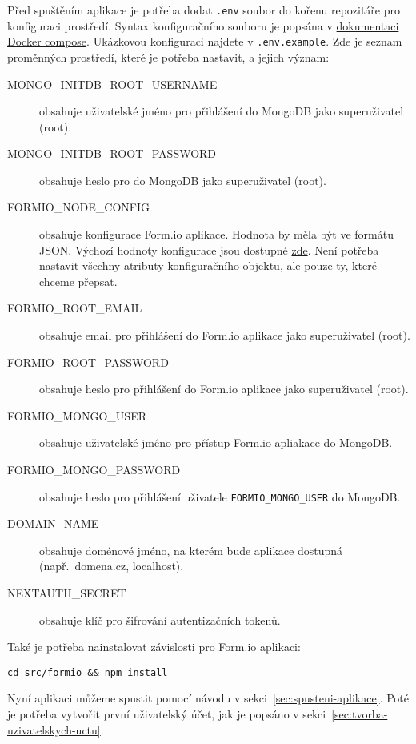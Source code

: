 Před spuštěním aplikace je potřeba dodat \texttt{.env} soubor do kořenu repozitáře pro konfiguraci prostředí.
Syntax konfiguračního souboru je popsána v \href{https://docs.docker.com/compose/environment-variables/env-file/}{dokumentaci Docker compose}.
Ukázkovou konfiguraci najdete v \texttt{.env.example}.
Zde je seznam proměnných prostředí, které je potřeba nastavit, a jejich význam:

\begin{description}
    \item[MONGO\_INITDB\_ROOT\_USERNAME] obsahuje uživatelské jméno pro přihlášení do MongoDB jako superuživatel (root).
    \item[MONGO\_INITDB\_ROOT\_PASSWORD] obsahuje heslo pro do MongoDB jako superuživatel (root).
    \item[FORMIO\_NODE\_CONFIG] obsahuje konfigurace Form.io aplikace.
    Hodnota by měla být ve formátu JSON\@.
    Výchozí hodnoty konfigurace jsou dostupné \href{https://github.com/formio/formio/blob/3.5.x/config/default.json}{zde}.
    Není potřeba nastavit všechny atributy konfiguračního objektu, ale pouze ty, které chceme přepsat.
    \item[FORMIO\_ROOT\_EMAIL] obsahuje email pro přihlášení do Form.io aplikace jako superuživatel (root).
    \item[FORMIO\_ROOT\_PASSWORD] obsahuje heslo pro přihlášení do Form.io aplikace jako superuživatel (root).
    \item[FORMIO\_MONGO\_USER] obsahuje uživatelské jméno pro přístup Form.io apliakace do MongoDB\@.
    \item[FORMIO\_MONGO\_PASSWORD] obsahuje heslo pro přihlášení uživatele \texttt{FORMIO\_MONGO\_USER} do MongoDB\@.
    \item[DOMAIN\_NAME] obsahuje doménové jméno, na kterém bude aplikace dostupná (např.\ domena.cz, localhost).
    \item[NEXTAUTH\_SECRET] obsahuje klíč pro šifrování autentizačních tokenů.
\end{description}

Také je potřeba nainstalovat závislosti pro Form.io aplikaci:

\begin{verbatim}
cd src/formio && npm install
\end{verbatim}

Nyní aplikaci můžeme spustit pomocí návodu v sekci~\ref{sec:spusteni-aplikace}.
Poté je potřeba vytvořit první uživatelský účet, jak je popsáno v sekci~\ref{sec:tvorba-uzivatelskych-uctu}.


